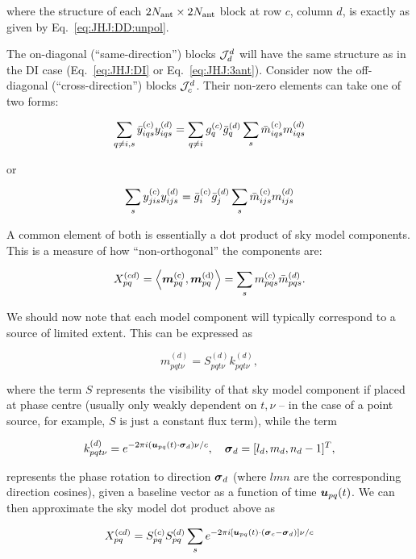 \documentclass[useAMS,usenatbib]{mn2e}
\begin{document}
where the structure of each $2N_\mathrm{ant}\times2N_\mathrm{ant}$ block at row $c$, column $d$, is exactly as 
given by Eq.~\ref{eq:JHJ:DD:unpol}. 


The on-diagonal (``same-direction'') blocks $\mathcal{J}^d_d$ will have the same structure as in the DI 
case (Eq.~\ref{eq:JHJ:DI} or Eq.~\ref{eq:JHJ:3ant}). Consider now the off-diagonal (``cross-direction'') 
blocks $\mathcal{J}^d_c$. Their non-zero elements can take one of two forms:

\[
  \sum\limits_{q\ne i,s} \bar{y}^{(c)}_{iqs} y^{(d)}_{iqs} = \sum\limits_{q\ne i} g^{(c)}_q \bar{g}^{(d)}_q \sum_s \bar{m}^{(c)}_{iqs} m^{(d)}_{iqs}
\]

or

\begin{equation}
  \sum\limits_{s} y^{(c)}_{jis} y^{(d)}_{ijs} = \bar{g}^{(c)}_i \bar{g}^{(d)}_j \sum_s \bar{m}^{(c)}_{ijs} m^{(d)}_{ijs}
\label{eq:JHJ:DD:crossterms}
\end{equation}

A common element of both is essentially a dot product of sky model components. This is a 
measure of how ``non-orthogonal'' the components are:

\begin{equation}
\label{eq:Xpqcd}
X_{pq}^{(cd)} = \left \langle \bmath{m}_{pq}^\mathrm{(c)},\bmath{m}^\mathrm{(d)}_{pq} \right \rangle = \sum_s \mmc_{pqs} \mmdH_{pqs}.
\end{equation}

We should now note that each model component will typically correspond to a source of limited extent. This can be 
expressed as

\[
m_{pqt\nu}^{(d)} = S^{(d)}_{pqt\nu} k^{(d)}_{pqt\nu}, 
\]

where the term $S$ represents the visibility of that sky model component if placed at phase centre (usually 
only weakly dependent on $t,\nu$ -- in the case of a point source, for example, $S$ is just a constant flux term),
while the term

\[
k^{(d)}_{pqt\nu} = e^{-2\pi i (\bmath{u}_{pq}(t)\cdot\bmath{\sigma}_d)\nu/c},~~~\bmath{\sigma}_d = [l_d,m_d,n_d-1]^T,
\]

represents the phase rotation to direction $\bmath{\sigma}_d$ (where $lmn$ are the corresponding direction cosines), 
given a baseline vector as a function of time $\bmath{u}_{pq}(t)$. We can then approximate the sky model dot product above as

\[
X_{pq}^{(cd)} = S^{(c)}_{pq}S^{(d)}_{pq} \sum_s e^{-2\pi i [\bmath{u}_{pq}(t)\cdot(\bmath{\sigma}_c-\bmath{\sigma}_d) ]\nu/c}
\]
\end{document}

